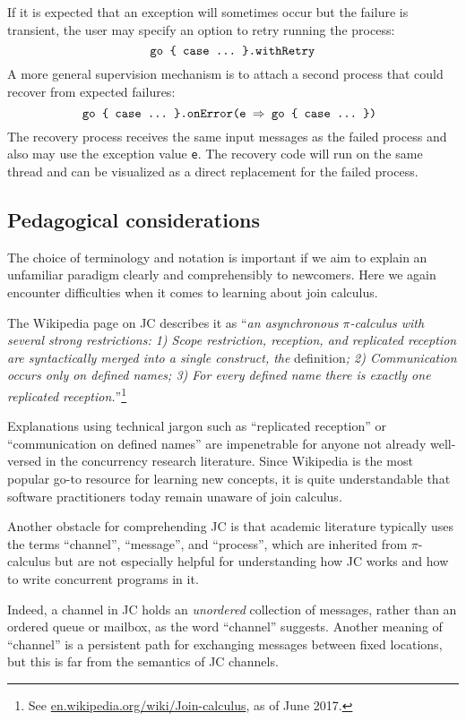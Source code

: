 \documentclass[sigplan,10pt,review,anonymous]{acmart}\settopmatter{printfolios=true}
\begin{document}
If it is expected that an exception will sometimes occur but the failure
is transient, the user may specify an option to retry running the
process:
\[
\text{\texttt{go \{ case ...~\}.withRetry}}
\]
A more general supervision mechanism is to attach a second process
that could recover from expected failures:
\[
\text{\texttt{go \{ case ...~\}.onError(e \ensuremath{\Rightarrow} go \{ case ...~\}) }}
\]
The recovery process receives the same input messages as the failed
process and also may use the exception value \texttt{e}. The
recovery code will run on the same thread and can be visualized
as a direct replacement for the failed process.

\subsection{Pedagogical considerations}

The choice of terminology and notation is important if we aim to explain
an unfamiliar paradigm clearly and comprehensibly to newcomers. Here
we again encounter difficulties when it comes to learning about join
calculus. 

The Wikipedia page on JC describes it as ``\emph{an asynchronous
$\pi$-calculus with several strong restrictions: 1) Scope restriction,
reception, and replicated reception are syntactically merged into
a single construct, the }definition\emph{; 2) Communication occurs
only on defined names; 3) For every defined name there is exactly
one replicated reception.}''\footnote{ See \href{https://en.wikipedia.org/wiki/Join-calculus}{en.wikipedia.org/wiki/Join-calculus},
as of June 2017.}

Explanations using technical jargon such as ``replicated reception''
or ``communication on defined names'' are impenetrable for anyone
not already well-versed in the concurrency research literature. Since
Wikipedia is the most popular go-to resource for learning new concepts,
it is quite understandable that software practitioners today remain
unaware of join calculus.

Another obstacle for comprehending JC is that academic literature
typically uses the terms \textquotedblleft channel\textquotedblright ,
``message'', and ``process'', which are inherited from $\pi$-calculus
but are not especially helpful for understanding how JC works and
how to write concurrent programs in it.

Indeed, a channel in JC holds an \emph{unordered} collection of messages,
rather than an ordered queue or mailbox, as the word \textquotedblleft channel\textquotedblright{}
suggests. Another meaning of \textquotedblleft channel\textquotedblright{}
is a persistent path for exchanging messages between fixed locations,
but this is far from the semantics of JC channels.
\end{document}
